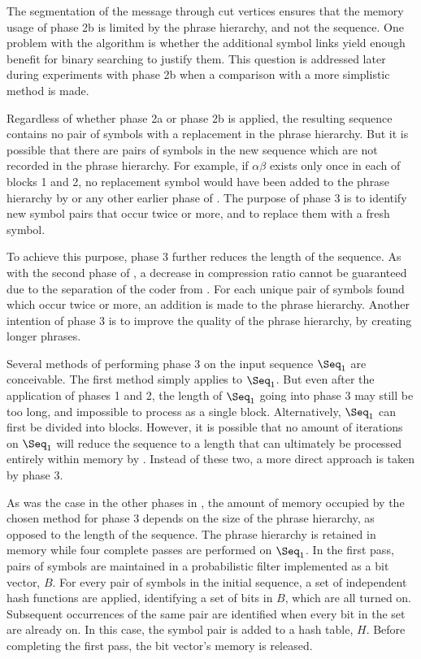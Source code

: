 The segmentation of the message through cut vertices ensures
that the memory usage of phase 2b is limited by the phrase
hierarchy, and not the sequence.  One problem 
with the algorithm is whether the
additional symbol links yield enough benefit for binary
searching to justify them.  This question is addressed later
during experiments with phase 2b when a comparison 
with a more simplistic method is made.


Regardless of whether phase 2a or phase 2b is applied,
the resulting sequence contains 
no pair of symbols with a replacement in the phrase hierarchy.  But
it is possible that there are pairs of symbols in the new 
sequence which are not recorded in the phrase hierarchy.
For example, if $\alpha$$\beta$ exists only once in each 
of blocks 1 and 2, no replacement symbol would have been added
to the phrase hierarchy by \repair or any other earlier phase
of \remerge.  The purpose of phase 3 is to
identify new symbol pairs that occur twice or more, and 
to replace them with a fresh symbol.

To achieve this purpose, phase 3 further reduces the length of 
the sequence.  As with the second phase of \remerge, 
a decrease in compression ratio cannot be guaranteed due to
the separation of the coder from \repair.
For each unique pair of symbols found which occur twice or 
more, an addition is made to the phrase hierarchy.  
Another intention of
phase 3 is to improve the quality 
of the phrase hierarchy, by creating longer 
phrases.

Several methods of performing phase 3 on the input sequence
$\Seq_1$ are conceivable.  The first method
simply applies \repair to $\Seq_1$.  But even after 
the application of phases 1 and 2, the length of $\Seq_1$ going
into phase 3 may 
still be too long, and impossible to process  
as a single \repair block.  Alternatively, $\Seq_1$ can first be divided
into blocks.  However, it is possible that
no amount of iterations on $\Seq_1$ will reduce the sequence to
a length that can ultimately be processed entirely within memory
by \repair.  Instead of these two, a more direct approach
is taken by phase 3.

As was the case in the other phases in \remerge, the amount of memory 
occupied by the chosen method for phase 3 depends on the size of the
phrase hierarchy, as opposed to the length of the sequence.  The phrase 
hierarchy is retained in memory while four complete passes 
are performed on $\Seq_1$.  In the
first pass, pairs of symbols are maintained in a probabilistic
filter implemented as a bit vector,
$B$.  For every pair of symbols in the initial sequence, 
a set of independent hash functions are applied, identifying a set of
bits in $B$, which are all turned on.  Subsequent occurrences
of the same pair are identified when every bit in the set are already
on.  In this case, the symbol pair is added to a hash table, $H$.
Before completing the first pass, the bit vector's memory is released.


